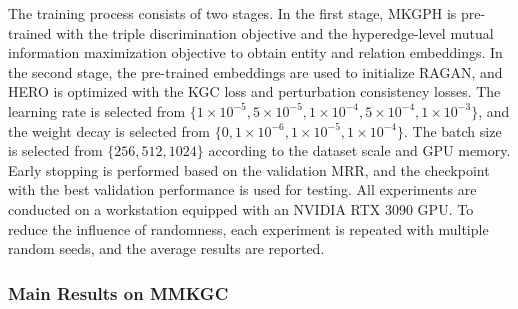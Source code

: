 \documentclass[pdflatex,sn-mathphys-num]{sn-jnl}
\begin{document}
The training process consists of two stages. In the first stage, MKGPH is pre-trained with the triple discrimination objective and the hyperedge-level mutual information maximization objective to obtain entity and relation embeddings. In the second stage, the pre-trained embeddings are used to initialize RAGAN, and HERO is optimized with the KGC loss and perturbation consistency losses. The learning rate is selected from $\{1\times10^{-5},5\times10^{-5},1\times10^{-4},5\times10^{-4},1\times10^{-3}\}$, and the weight decay is selected from $\{0,1\times10^{-6},1\times10^{-5},1\times10^{-4}\}$. The batch size is selected from $\{256,512,1024\}$ according to the dataset scale and GPU memory. Early stopping is performed based on the validation MRR, and the checkpoint with the best validation performance is used for testing.
All experiments are conducted on a workstation equipped with an NVIDIA RTX 3090 GPU. To reduce the influence of randomness, each experiment is repeated with multiple random seeds, and the average results are reported.


\subsubsection{Main Results on MMKGC}
\end{document}
